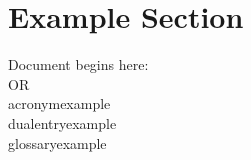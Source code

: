 \documentclass[../main.tex]{subfiles}
\begin{document}
	\section{Example Section}
		Document begins here:       \\
		\cite[cite]{Bibtex2021} OR\cite{Bibtex2021}\\
		\gls{acronymexample}\\
		\gls{dualentryexample}\\
		\gls{glossaryexample}\\
		
\end{document}
